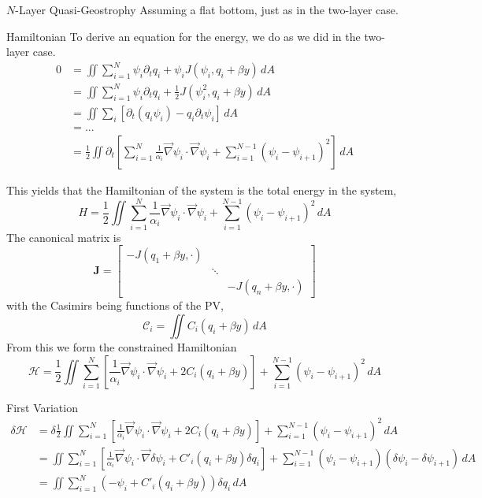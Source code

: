 \documentclass[12pt]{article}
\begin{document}
\begin{section}{$N$-Layer Quasi-Geostrophy}
    Assuming a flat bottom, just as in the two-layer case.

    \begin{subsection}{Hamiltonian}
        To derive an equation for the energy, we do as we did in the two-layer case.
        \begin{align*}
        0 &= \iint \sum_{i=1}^N \psi_i \partial_t q_i + \psi_i J(\psi_i, q_i + \beta y) \, dA \\
        &= \iint \sum_{i=1}^N \psi_i \partial_t q_i + \frac12 J(\psi_i^2, q_i + \beta y) \, dA \\
        &= \iint \sum_i \left[\partial_t(q_i \psi_i) - q_i \partial_t\psi_i \right] \, dA \\
        &= ... \\
        &= \frac12 \iint \partial_t \left[ \sum_{i=1}^N \frac{1}{\alpha_i} \vec\nabla \psi_i \cdot \vec\nabla \psi_i + \sum_{i=1}^{N-1} (\psi_i - \psi_{i+1})^2 \right]\, dA
        \end{align*}

        This yields that the Hamiltonian of the system is the total energy in the system,
        $$
        H = \frac12 \iint \sum_{i=1}^N \frac{1}{\alpha_i}\vec\nabla \psi_i \cdot \vec\nabla \psi_i + \sum_{i=1}^{N-1} (\psi_i - \psi_{i+1})^2 \, dA
        $$
        The canonical matrix is
        $$
        \mathbf{J} = \left[\begin{array}{ccc}
        -J(q_1 + \beta y, \cdot) & & \\
        & \ddots & \\
        & & -J(q_n + \beta y, \cdot)
        \end{array}\right]
        $$
        with the Casimirs being functions of the PV,
        $$
        \mathcal{C}_i = \iint C_i(q_i + \beta y) \, dA
        $$
        From this we form the constrained Hamiltonian
        \begin{equation}
        \mathcal{H} = \frac12 \iint \sum_{i=1}^N \left[ \frac{1}{\alpha_i} \vec\nabla \psi_i \cdot \vec\nabla \psi_i + 2C_i(q_i + \beta y) \right] + \sum_{i=1}^{N-1} (\psi_i - \psi_{i+1})^2 \, dA
        \label{eqn:qg_Nl_h}
        \end{equation}
    \end{subsection}

    \begin{subsection}{First Variation}
        \begin{align*}
        \delta \mathcal{H} &= \delta\frac12 \iint \sum_{i=1}^N \left[ \frac{1}{\alpha_i} \vec\nabla \psi_i \cdot \vec\nabla \psi_i + 2C_i(q_i + \beta y) \right] + \sum_{i=1}^{N-1} (\psi_i - \psi_{i+1})^2 \, dA \\
        &= \iint \sum_{i=1}^N \left[ \frac{1}{\alpha_i} \vec\nabla \psi_i \cdot \vec\nabla \delta\psi_i + C'_i(q_i + \beta y) \delta q_i \right]+ \sum_{i=1}^{N-1} (\psi_i - \psi_{i+1})(\delta \psi_i - \delta \psi_{i+1}) \, dA \\
        &= \iint \sum_{i=1}^N (-\psi_i + C'_i(q_i + \beta y)) \delta q_i\, dA \\
        \end{align*}


\end{subsection}
\end{section}
\end{document}
